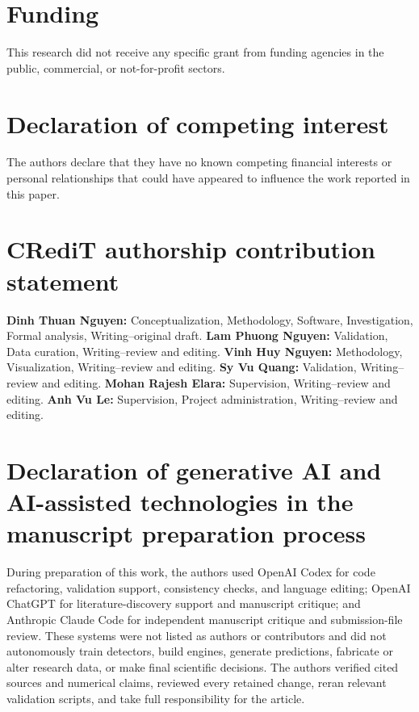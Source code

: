 \documentclass[a4paper,fleqn]{cas-dc}
\begin{document}
\section*{Funding}

This research did not receive any specific grant from funding agencies in the public, commercial, or not-for-profit sectors.

\section*{Declaration of competing interest}

The authors declare that they have no known competing financial interests or personal relationships that could have appeared to influence the work reported in this paper.

\section*{CRediT authorship contribution statement}

\textbf{Dinh Thuan Nguyen:} Conceptualization, Methodology, Software, Investigation, Formal analysis, Writing--original draft. \textbf{Lam Phuong Nguyen:} Validation, Data curation, Writing--review and editing. \textbf{Vinh Huy Nguyen:} Methodology, Visualization, Writing--review and editing. \textbf{Sy Vu Quang:} Validation, Writing--review and editing. \textbf{Mohan Rajesh Elara:} Supervision, Writing--review and editing. \textbf{Anh Vu Le:} Supervision, Project administration, Writing--review and editing.

\section*{Declaration of generative AI and AI-assisted technologies in the manuscript preparation process}

During preparation of this work, the authors used OpenAI Codex for code refactoring, validation support, consistency checks, and language editing; OpenAI ChatGPT for literature-discovery support and manuscript critique; and Anthropic Claude Code for independent manuscript critique and submission-file review. These systems were not listed as authors or contributors and did not autonomously train detectors, build engines, generate predictions, fabricate or alter research data, or make final scientific decisions. The authors verified cited sources and numerical claims, reviewed every retained change, reran relevant validation scripts, and take full responsibility for the article.



\end{document}

